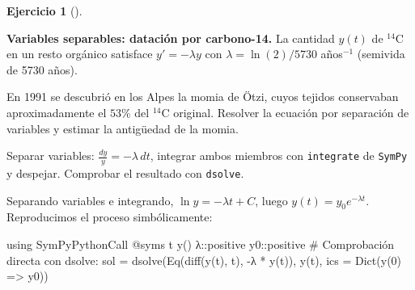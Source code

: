 \documentclass[
  spanish,
  a4paper,
]{scrreport}
\newenvironment{Shaded}{\begin{snugshade}}{\end{snugshade}}
\newcommand{\BuiltInTok}[1]{\textcolor[rgb]{0.00,0.23,0.31}{#1}}
\newcommand{\CommentTok}[1]{\textcolor[rgb]{0.37,0.37,0.37}{#1}}
\newcommand{\DataTypeTok}[1]{\textcolor[rgb]{0.68,0.00,0.00}{#1}}
\newcommand{\FloatTok}[1]{\textcolor[rgb]{0.68,0.00,0.00}{#1}}
\newcommand{\FunctionTok}[1]{\textcolor[rgb]{0.28,0.35,0.67}{#1}}
\newcommand{\ImportTok}[1]{\textcolor[rgb]{0.00,0.46,0.62}{#1}}
\newcommand{\NormalTok}[1]{\textcolor[rgb]{0.00,0.23,0.31}{#1}}
\newcommand{\OperatorTok}[1]{\textcolor[rgb]{0.37,0.37,0.37}{#1}}
\newcommand{\PreprocessorTok}[1]{\textcolor[rgb]{0.68,0.00,0.00}{#1}}
\theoremstyle{definition}
\newtheorem{exercise}{Ejercicio}[chapter]
\theoremstyle{remark}
\begin{document}
\begin{exercise}[]\protect\hypertarget{exr-separables-carbono}{}\label{exr-separables-carbono}

\textbf{Variables separables: datación por carbono-14.} La cantidad
\(y(t)\) de \(^{14}\)C en un resto orgánico satisface
\(y' = -\lambda y\) con \(\lambda = \ln(2)/5730\) años\(^{-1}\)
(semivida de 5730 años).

En 1991 se descubrió en los Alpes la momia de Ötzi, cuyos tejidos
conservaban aproximadamente el \(53\%\) del \(^{14}\)C original.
Resolver la ecuación por separación de variables y estimar la antigüedad
de la momia.

\begin{tcolorbox}[enhanced jigsaw, arc=.35mm, bottomrule=.15mm, bottomtitle=1mm, breakable, colback=white, colbacktitle=quarto-callout-note-color!10!white, colframe=quarto-callout-note-color-frame, coltitle=black, left=2mm, leftrule=.75mm, opacityback=0, opacitybacktitle=0.6, rightrule=.15mm, title=\textcolor{quarto-callout-note-color}{\faInfo}\hspace{0.5em}{Ayuda}, titlerule=0mm, toprule=.15mm, toptitle=1mm]

Separar variables: \(\frac{dy}{y} = -\lambda\, dt\), integrar ambos
miembros con \texttt{integrate} de \texttt{SymPy} y despejar. Comprobar
el resultado con \texttt{dsolve}.

\end{tcolorbox}

\begin{tcolorbox}[enhanced jigsaw, arc=.35mm, bottomrule=.15mm, bottomtitle=1mm, breakable, colback=white, colbacktitle=quarto-callout-tip-color!10!white, colframe=quarto-callout-tip-color-frame, coltitle=black, left=2mm, leftrule=.75mm, opacityback=0, opacitybacktitle=0.6, rightrule=.15mm, title=\textcolor{quarto-callout-tip-color}{\faLightbulb}\hspace{0.5em}{Solución}, titlerule=0mm, toprule=.15mm, toptitle=1mm]

Separando variables e integrando, \(\ln y = -\lambda t + C\), luego
\(y(t)=y_0 e^{-\lambda t}\). Reproducimos el proceso simbólicamente:

\begin{Shaded}
\begin{Highlighting}[]
\ImportTok{using} \BuiltInTok{SymPyPythonCall}
\PreprocessorTok{@syms}\NormalTok{ t }\FunctionTok{y}\NormalTok{() λ}\OperatorTok{::}\DataTypeTok{positive }\NormalTok{y0}\OperatorTok{::}\DataTypeTok{positive}
\CommentTok{\# Comprobación directa con dsolve:}
\NormalTok{sol }\OperatorTok{=} \FunctionTok{dsolve}\NormalTok{(}\FunctionTok{Eq}\NormalTok{(}\FunctionTok{diff}\NormalTok{(}\FunctionTok{y}\NormalTok{(t), t), }\OperatorTok{{-}}\NormalTok{λ }\OperatorTok{*} \FunctionTok{y}\NormalTok{(t)), }\FunctionTok{y}\NormalTok{(t), ics }\OperatorTok{=} \FunctionTok{Dict}\NormalTok{(}\FunctionTok{y}\NormalTok{(}\FloatTok{0}\NormalTok{) }\OperatorTok{=\textgreater{}}\NormalTok{ y0))}
\end{Highlighting}
\end{Shaded}


\end{tcolorbox}
\end{exercise}
\end{document}
